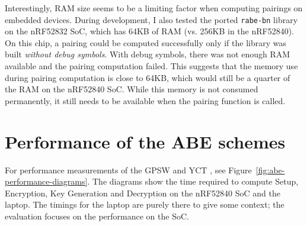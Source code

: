 Interestingly, RAM size seems to be a limiting factor when computing pairings on embedded devices.
During development, I also tested the ported \texttt{rabe-bn} library on the nRF52832 SoC, which has 64KB of RAM (vs. 256KB in the nRF52840). 
On this chip, a pairing could be computed successfully only if the library was built \emph{without debug symbols}.
With debug symbols, there was not enough RAM available and the pairing computation failed.
This suggests that the memory use during pairing computation is close to 64KB, which would still be a quarter of the RAM on the nRF52840 SoC.
While this memory is not consumed permanently, it still needs to be available when the pairing function is called.

\section{Performance of the ABE schemes}

For performance measurements of the GPSW and YCT , see Figure~\ref{fig:abe-performance-diagrams}. 
The diagrams show the time required to compute Setup, Encryption, Key Generation and Decryption on the nRF52840 SoC and the laptop.
The timings for the laptop are purely there to give some context; the evaluation focuses on the performance on the SoC.

